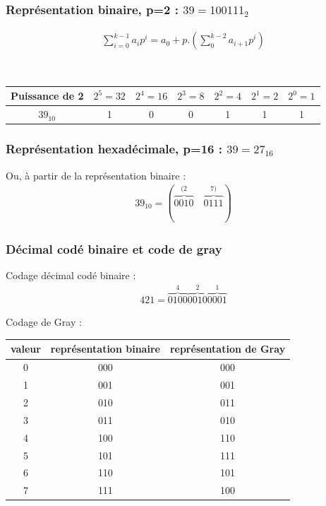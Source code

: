 \documentclass{beamer}
\begin{document}
\begin{frame}
\frametitle{Représentation binaire, p=2 : $39 = 100111_2$}

\begin{eqnarray*}
\sum_{i=0}^{k-1} a_i p^i = a_0 + p.(\sum_{0}^{k-2} a_{i+1} p^i)
\end{eqnarray*}

\\
\begin{small}
\centering\begin{tabular}{c|c|c|c|c|c|c}
Puissance de 2 & $2^5 = 32$ & $2^4 = 16$ & $2^3= 8$ & $2^2=4$ & $2^1 = 2$ & $2^0 = 1$\\
\hline
$39_{10}$  &   1 &  0 & 0 & 1 & 1 &1 
\end{tabular}
\end{small}


\end{frame}

\begin{frame}
\frametitle{Représentation hexadécimale, p=16 : $39 = 27_{16}$}

\begin{center}\end{center}

Ou, à partir de la représentation binaire : 
\begin{eqnarray*}
39_{10} =  (\overbrace{0010}^{(2}\quad\overbrace{0111}^{7)})
\end{eqnarray*}

\end{frame}


\begin{frame}
\frametitle{Décimal codé binaire et code de gray}
Codage décimal codé binaire : 
\begin{eqnarray*}
421 = \overbrace{0100}^{4} \overbrace{0010}^{2} \overbrace{0001}^{1}
\end{eqnarray*}

Codage de Gray : 
\begin{center}
\begin{tabular}{c|c|c}
valeur & représentation binaire & représentation de Gray\\
\hline
0  & 000 & 000 \\
1  & 001 & 001 \\
2  & 010 & 011 \\
3  & 011 & 010 \\
4  & 100 & 110 \\
5  & 101 & 111 \\
6  & 110 & 101 \\
7  & 111 & 100
\end{tabular}
\end{center}

\end{frame}
\end{document}
